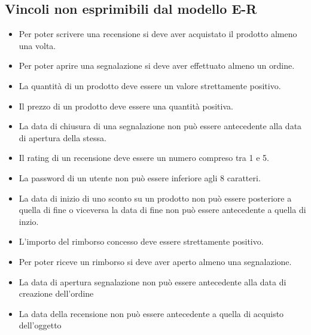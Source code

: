 \subsection{Vincoli non esprimibili dal modello E-R}

\begin{itemize}
    \item Per poter scrivere una recensione si deve aver acquistato il prodotto almeno una volta. 
    \item Per poter aprire una segnalazione si deve aver effettuato almeno un ordine.
    \item La quantità di un prodotto deve essere un valore strettamente positivo.
    \item Il prezzo di un prodotto deve essere una quantità positiva.
    \item La data di chiusura di una segnalazione non può essere antecedente alla data di apertura della stessa.
    \item Il rating di un recensione deve essere un numero compreso tra 1 e 5.
    \item La password di un utente non può essere inferiore agli 8 caratteri.
    \item La data di inizio di uno sconto su un prodotto non può essere posteriore a quella di fine o viceversa la data di fine non può essere antecedente a quella di inzio.
    \item L'importo del rimborso concesso deve essere strettamente positivo.
    \item Per poter riceve un rimborso si deve aver aperto almeno una segnalazione.
    \item La data di apertura segnalazione non può essere antecedente alla data di creazione dell'ordine
    \item La data della recensione non può essere antecedente a quella di acquisto dell'oggetto
\end{itemize}